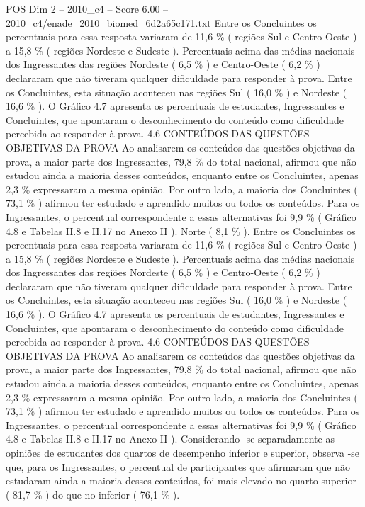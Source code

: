 \begin{textsample}{POS Dim 2 – 2010\_c4 – Score 6.00 – 2010\_c4/enade\_2010\_biomed\_6d2a65c171.txt}
Entre os Concluintes os percentuais para essa resposta variaram de 11,6 \% ( regiões Sul e Centro-Oeste ) a 15,8 \% ( regiões Nordeste e Sudeste ).
Percentuais acima das médias nacionais dos Ingressantes das regiões Nordeste ( 6,5 \% ) e Centro-Oeste ( 6,2 \% ) declararam que não tiveram qualquer dificuldade para responder à prova.
Entre os Concluintes, esta situação aconteceu nas regiões Sul ( 16,0 \% ) e Nordeste ( 16,6 \% ).
O Gráfico 4.7 apresenta os percentuais de estudantes, Ingressantes e Concluintes, que apontaram o desconhecimento do conteúdo como dificuldade percebida ao responder à prova. 4.6 CONTEÚDOS DAS QUESTÕES OBJETIVAS DA PROVA Ao analisarem os conteúdos das questões objetivas da prova, a maior parte dos Ingressantes, 79,8 \% do total nacional, afirmou que não estudou ainda a maioria desses conteúdos, enquanto entre os Concluintes, apenas 2,3 \% expressaram a mesma opinião.
Por outro lado, a maioria dos Concluintes ( 73,1 \% ) afirmou ter estudado e aprendido muitos ou todos os conteúdos.
Para os Ingressantes, o percentual correspondente a essas alternativas foi 9,9 \% ( Gráfico 4.8 e Tabelas II.8 e II.17 no Anexo II ).
Norte ( 8,1 \% ).
Entre os Concluintes os percentuais para essa resposta variaram de 11,6 \% ( regiões Sul e Centro-Oeste ) a 15,8 \% ( regiões Nordeste e Sudeste ).
Percentuais acima das médias nacionais dos Ingressantes das regiões Nordeste ( 6,5 \% ) e Centro-Oeste ( 6,2 \% ) declararam que não tiveram qualquer dificuldade para responder à prova.
Entre os Concluintes, esta situação aconteceu nas regiões Sul ( 16,0 \% ) e Nordeste ( 16,6 \% ).
O Gráfico 4.7 apresenta os percentuais de estudantes, Ingressantes e Concluintes, que apontaram o desconhecimento do conteúdo como dificuldade percebida ao responder à prova. 4.6 CONTEÚDOS DAS QUESTÕES OBJETIVAS DA PROVA Ao analisarem os conteúdos das questões objetivas da prova, a maior parte dos Ingressantes, 79,8 \% do total nacional, afirmou que não estudou ainda a maioria desses conteúdos, enquanto entre os Concluintes, apenas 2,3 \% expressaram a mesma opinião.
Por outro lado, a maioria dos Concluintes ( 73,1 \% ) afirmou ter estudado e aprendido muitos ou todos os conteúdos.
Para os Ingressantes, o percentual correspondente a essas alternativas foi 9,9 \% ( Gráfico 4.8 e Tabelas II.8 e II.17 no Anexo II ).
Considerando -se separadamente as opiniões de estudantes dos quartos de desempenho inferior e superior, observa -se que, para os Ingressantes, o percentual de participantes que afirmaram que não estudaram ainda a maioria desses conteúdos, foi mais elevado no quarto superior ( 81,7 \% ) do que no inferior ( 76,1 \% ).

\end{textsample}
